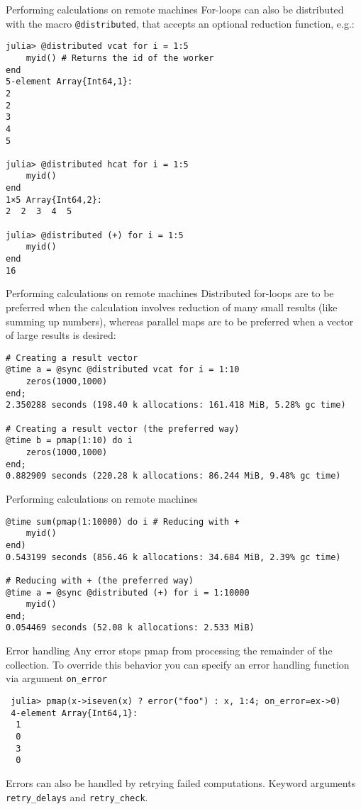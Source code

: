 \documentclass[10pt]{beamer}
\begin{document}
\begin{frame}[fragile]{Performing calculations on remote machines}
For-loops can also be distributed with the macro \texttt{@distributed}, that accepts an optional reduction function, e.g.:
\begin{verbatim}
julia> @distributed vcat for i = 1:5
    myid() # Returns the id of the worker
end
5-element Array{Int64,1}:
2
2
3
4
5

julia> @distributed hcat for i = 1:5
    myid()
end
1×5 Array{Int64,2}:
2  2  3  4  5

julia> @distributed (+) for i = 1:5
    myid()
end
16
\end{verbatim}
\end{frame}


\begin{frame}[fragile]{Performing calculations on remote machines}
Distributed for-loops are to be preferred when the calculation involves reduction of many small results (like summing up numbers), whereas parallel maps are to be preferred when a vector of large results is desired:
\begin{verbatim}
# Creating a result vector
@time a = @sync @distributed vcat for i = 1:10
    zeros(1000,1000)
end;
2.350288 seconds (198.40 k allocations: 161.418 MiB, 5.28% gc time)

# Creating a result vector (the preferred way)
@time b = pmap(1:10) do i
    zeros(1000,1000)
end;
0.882909 seconds (220.28 k allocations: 86.244 MiB, 9.48% gc time)
\end{verbatim}
\end{frame}

\begin{frame}[fragile]{Performing calculations on remote machines}
\begin{verbatim}
@time sum(pmap(1:10000) do i # Reducing with +
    myid()
end)
0.543199 seconds (856.46 k allocations: 34.684 MiB, 2.39% gc time)

# Reducing with + (the preferred way)
@time a = @sync @distributed (+) for i = 1:10000
    myid()
end;
0.054469 seconds (52.08 k allocations: 2.533 MiB)
\end{verbatim}
\end{frame}


\begin{frame}[fragile]{Error handling}{}
    Any error stops pmap from processing the remainder of the collection. To override this behavior you can specify an error handling function via argument \verb+on_error+
\begin{verbatim}
 julia> pmap(x->iseven(x) ? error("foo") : x, 1:4; on_error=ex->0)
 4-element Array{Int64,1}:
  1
  0
  3
  0
\end{verbatim}
 Errors can also be handled by retrying failed computations. Keyword arguments \verb+retry_delays+ and \verb+retry_check+.
\end{frame}
\end{document}
